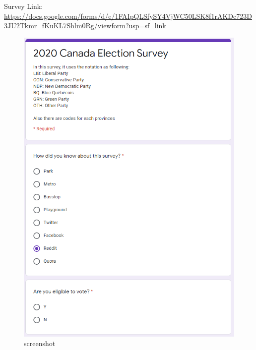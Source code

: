 \documentclass[
]{article}
\begin{document}
Survey Link:
\url{https://docs.google.com/forms/d/e/1FAIpQLSfySY4VjWC50LSK8f1rAKDc723D3JU2Tkmr_fKuKL7Shlm0Rg/viewform?usp=sf_link}

\begin{figure}
\centering
\includegraphics{./screenshot.PNG}
\caption{screenshot}
\end{figure}
\end{document}
